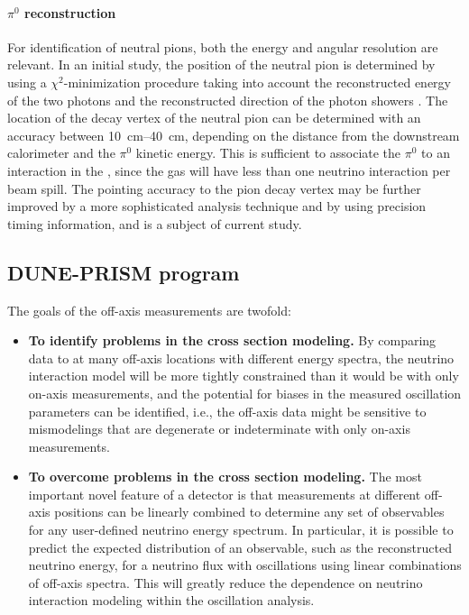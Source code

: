 \paragraph{$\pi^0$ reconstruction} For identification of neutral pions, both the energy and angular resolution are relevant. In an initial study, the position of the neutral pion is determined by using a $\chi^2$-minimization procedure taking into account the reconstructed energy of the two photons and the reconstructed direction of the photon showers \cite{Emberger:2018pgr}. The location of the decay vertex of the neutral pion can be determined with an accuracy between \SIrange{10}{40}{\cm}, depending on the distance from the downstream calorimeter and the $\pi^0$ kinetic energy. This is sufficient to associate the $\pi^0$ to an interaction in the , since the gas will have less than one neutrino interaction per beam spill.
The pointing accuracy to the pion decay vertex may be further improved by a more sophisticated analysis technique and by using precision timing information, and is a subject of current study.





\subsection{DUNE-PRISM program}
\label{sec:appx-nd:DP}



The goals of the off-axis measurements are twofold:
\begin{itemize}
\item {\bf To identify problems in the cross section modeling.} By comparing   data to  at many off-axis locations with different energy spectra, the neutrino interaction model will be more tightly constrained than it would be with only on-axis measurements, and the potential for biases in the measured oscillation parameters can be identified, i.e., the off-axis data might be sensitive to mismodelings that are degenerate or indeterminate with only on-axis measurements.
\item {\bf To overcome problems in the cross section modeling.} The most important novel feature of a  detector is that measurements at different off-axis positions can be linearly combined to determine any set of observables for any user-defined neutrino energy spectrum. In particular, it is possible to predict the expected distribution of an observable, such as the reconstructed neutrino energy, for a neutrino flux with oscillations  using linear combinations of   off-axis spectra.  This will greatly reduce the dependence on neutrino interaction modeling within the oscillation analysis.
\end{itemize}

